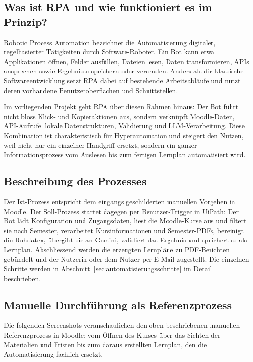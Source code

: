 \documentclass[11pt]{scrartcl}
\begin{document}
\subsection{Was ist RPA und wie funktioniert es im Prinzip?}
Robotic Process Automation bezeichnet die Automatisierung digitaler, regelbasierter Tätigkeiten durch Software-Roboter. Ein Bot kann etwa Applikationen öffnen, Felder ausfüllen, Dateien lesen, Daten transformieren, APIs ansprechen sowie Ergebnisse speichern oder versenden. Anders als die klassische Softwareentwicklung setzt RPA dabei auf bestehende Arbeitsabläufe und nutzt deren vorhandene Benutzeroberflächen und Schnittstellen.

Im vorliegenden Projekt geht RPA über diesen Rahmen hinaus: Der Bot führt nicht bloss Klick- und Kopieraktionen aus, sondern verknüpft Moodle-Daten, API-Aufrufe, lokale Datenstrukturen, Validierung und LLM-Verarbeitung. Diese Kombination ist charakteristisch für Hyperautomation und steigert den Nutzen, weil nicht nur ein einzelner Handgriff ersetzt, sondern ein ganzer Informationsprozess vom Auslesen bis zum fertigen Lernplan automatisiert wird.

\subsection{Beschreibung des Prozesses}
Der Ist-Prozess entspricht dem eingangs geschilderten manuellen Vorgehen in Moodle. Der Soll-Prozess startet dagegen per Benutzer-Trigger in UiPath: Der Bot lädt Konfiguration und Zugangsdaten, liest die Moodle-Kurse aus und filtert sie nach Semester, verarbeitet Kursinformationen und Semester-PDFs, bereinigt die Rohdaten, übergibt sie an Gemini, validiert das Ergebnis und speichert es als Lernplan. Abschliessend werden die erzeugten Lernpläne zu PDF-Berichten gebündelt und der Nutzerin oder dem Nutzer per E-Mail zugestellt. Die einzelnen Schritte werden in Abschnitt~\ref{sec:automatisierungsschritte} im Detail beschrieben.

\subsection{Manuelle Durchführung als Referenzprozess}
Die folgenden Screenshots veranschaulichen den oben beschriebenen manuellen Referenzprozess in Moodle: vom Öffnen des Kurses über das Sichten der Materialien und Fristen bis zum daraus erstellten Lernplan, den die Automatisierung fachlich ersetzt.
\end{document}
